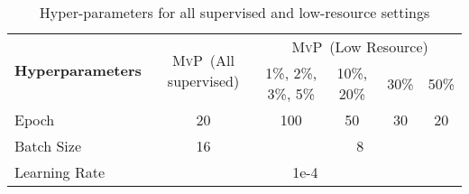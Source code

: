 \documentclass[11pt]{article}
\newcommand\mvp{\textsc{MvP}}
\begin{document}
\begin{table*}[h]
\centering
\begin{tabular}{l|ccccc}
\toprule
\multirow{2}{*}{\textbf{Hyperparameters}} &
  \multicolumn{1}{c|}{\multirow{2}{*}{\mvp~(All supervised)}} &
  \multicolumn{4}{c}{\mvp~(Low Resource)} \\ \cline{3-6} 
 &
  \multicolumn{1}{c|}{} &
  \multicolumn{1}{c|}{1\%, 2\%, 3\%, 5\%} &
  \multicolumn{1}{c|}{10\%, 20\%} &
  \multicolumn{1}{c|}{30\%} &
  50\% \\ \hline
Epoch &
  \multicolumn{1}{c|}{20} &
  \multicolumn{1}{c|}{100} &
  \multicolumn{1}{c|}{50} &
  \multicolumn{1}{c|}{30} &
  20 \\ \hline
Batch Size    & \multicolumn{1}{c|}{16} & \multicolumn{4}{c}{8} \\ \hline
Learning Rate & \multicolumn{5}{c}{1e-4}                        \\
\bottomrule
\end{tabular}
\caption{Hyper-parameters for all supervised and low-resource settings}
\label{tab:param}
\end{table*}
\end{document}
